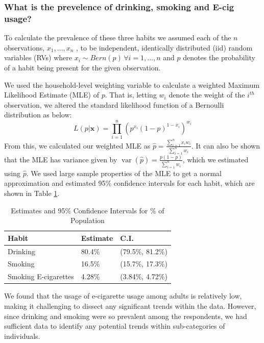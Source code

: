 \documentclass[
  11pt,
  twocolumn]{article}
\begin{document}
\hypertarget{what-is-the-prevelence-of-drinking-smoking-and-e-cig-usage}{%
\subsubsection{What is the prevelence of drinking, smoking and E-cig
usage?}\label{what-is-the-prevelence-of-drinking-smoking-and-e-cig-usage}}

To calculate the prevalence of these three habits we assumed each of the
\(n\) observations, \(x_1,…,x_n\) , to be independent, identically
distributed (iid) random variables (RVs) where
\(x_i \sim Bern(p)\, \forall i=1,…,n\) and \(p\) denotes the probability
of a habit being present for the given observation.

We used the household-level weighting variable to calculate a weighted
Maximum Likelihood Estimate (MLE) of \(p\). That is, letting \(w_i\)
denote the weight of the \(i^{th}\) observation, we altered the standard
likelihood function of a Bernoulli distribution as below:
\[L(p|\textbf{x}) = \prod_{i = 1}^{n} (p^{x_i}(1-p)^{1-x_i})^{w_i}\]
From this, we calculated our weighted MLE as
\(\widehat{p} = \frac{\sum_{i=1}^{n} x_iw_i}{\sum_{i=1}^{n} w_i}\). It
can also be shown that the MLE has variance given by
\(\mathop{\mathrm{var}}(\widehat{p})=\frac{p(1-p)}{\sum_{i=1}^{n}w_i}\),
which we estimated using \(\widehat{p}\). We used large sample
properties of the MLE to get a normal approximation and estimated 95\%
confidence intervals for each habit, which are shown in Table
\ref{tab:output-estimates-table}.

\begin{table}

\caption{\label{tab:outputestimatestable}Estimates and 95\% Confidence Intervals for \% of Population\label{tab:output-estimates-table}}
\centering
\fontsize{9}{11}\selectfont
\begin{tabular}[t]{l|l|l}
\hline
\textbf{Habit} & \textbf{Estimate} & \textbf{C.I.}\\
\hline
Drinking & 80.4\% & (79.5\%, 81.2\%)\\
\hline
Smoking & 16.5\% & (15.7\%, 17.3\%)\\
\hline
Smoking E-cigarettes & 4.28\% & (3.84\%, 4.72\%)\\
\hline
\end{tabular}
\end{table}

We found that the usage of e-cigarette usage among adults is relatively
low, making it challenging to dissect any significant trends within the
data. However, since drinking and smoking were so prevalent among the
respondents, we had sufficient data to identify any potential trends
within sub-categories of individuals.
\end{document}
